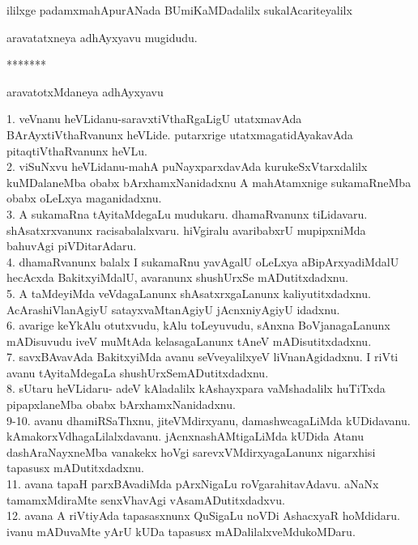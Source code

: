 \documentclass{article}
\begin{document}
\begin{center}
ililxge padamxmahApurANada BUmiKaMDadalilx sukalAcariteyalilx
\end{center}

\begin{center}
aravatatxneya adhAyxyavu mugidudu.
\end{center}

\begin{center}
*******
\end{center}

\begin{center}
aravatotxMdaneya adhAyxyavu
\end{center}

1. veVnanu heVLidanu-saravxtiVthaRgaLigU utatxmavAda BArAyxtiVthaRvanunx heVLide. putarxrige utatxmagatidAyakavAda pitaqtiVthaRvanunx heVLu.\\
2. viSuNxvu heVLidanu-mahA puNayxparxdavAda kurukeSxVtarxdalilx kuMDalaneMba obabx bArxhamxNanidadxnu A mahAtamxnige sukamaRneMba obabx oLeLxya maganidadxnu.\\
3. A sukamaRna tAyitaMdegaLu mudukaru. dhamaRvanunx tiLidavaru. shAsatxrxvanunx racisabalalxvaru. hiVgiralu avaribabxrU mupipxniMda bahuvAgi piVDitarAdaru.\\
4. dhamaRvanunx balalx I sukamaRnu yavAgalU oLeLxya aBipArxyadiMdalU hecAcxda BakitxyiMdalU, avaranunx shushUrxSe mADutitxdadxnu.\\
5. A taMdeyiMda veVdagaLanunx shAsatxrxgaLanunx kaliyutitxdadxnu. AcArashiVlanAgiyU satayxvaMtanAgiyU jAcnxniyAgiyU idadxnu.\\
6. avarige keYkAlu otutxvudu, kAlu toLeyuvudu, sAnxna BoVjanagaLanunx mADisuvudu iveV muMtAda kelasagaLanunx tAneV mADisutitxdadxnu.\\
7. savxBAvavAda BakitxyiMda avanu seVveyalilxyeV liVnanAgidadxnu. I riVti avanu tAyitaMdegaLa shushUrxSemADutitxdadxnu.\\
8. sUtaru heVLidaru- adeV kAladalilx kAshayxpara vaMshadalilx huTiTxda pipapxlaneMba obabx bArxhamxNanidadxnu.\\
9-10. avanu dhamiRSaThxnu, jiteVMdirxyanu, damashwcagaLiMda kUDidavanu. kAmakorxVdhagaLilalxdavanu. jAcnxnashAMtigaLiMda kUDida Atanu dashAraNayxneMba vanakekx hoVgi sarevxVMdirxyagaLanunx nigarxhisi tapasusx mADutitxdadxnu.\\
11. avana tapaH parxBAvadiMda pArxNigaLu roVgarahitavAdavu. aNaNx tamamxMdiraMte senxVhavAgi vAsamADutitxdadxvu.\\
12. avana A riVtiyAda tapasasxnunx QuSigaLu noVDi AshacxyaR hoMdidaru. ivanu mADuvaMte yArU kUDa tapasusx mADalilalxveMdukoMDaru.\\
\end{document}
